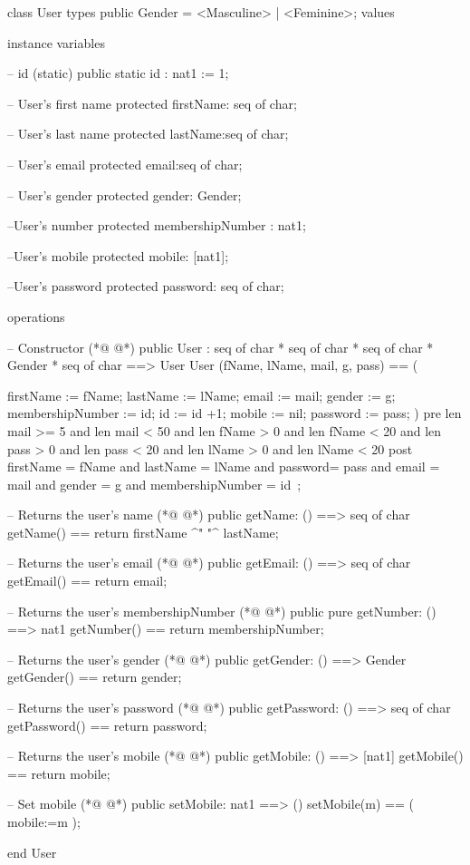 \begin{vdmpp}[breaklines=true]
class User
types
 public Gender = <Masculine> | <Feminine>;
values

instance variables
 
 -- id (static)
 public static id : nat1 := 1;
 
 -- User's first name
 protected firstName: seq of char;
 
 -- User's last name
 protected lastName:seq of char;
 
 -- User's email
 protected email:seq of char;
 
 -- User's gender
 protected gender: Gender;
 
 --User's number
 protected membershipNumber : nat1;
 
 --User's mobile
 protected mobile: [nat1];
 
 --User's password
 protected password: seq of char;
 
operations

 -- Constructor
(*@
\label{User:35}
@*)
 public User : seq of char * seq of char * seq of char * Gender * seq of char  ==> User
 User (fName, lName, mail, g, pass) == (
 
  firstName := fName;
   lastName := lName;
   email := mail;
   gender := g;
   membershipNumber := id;
   id := id +1;
   mobile := nil;
   password := pass;
 )
 pre len mail >= 5 and len mail < 50
  and len fName > 0 and len fName < 20
  and len pass > 0 and len pass < 20
  and len lName > 0 and len lName < 20
 post firstName = fName and lastName = lName and password= pass and email = mail and gender = g and membershipNumber = id~;
 
 
 -- Returns the user's name
(*@
\label{getName:55}
@*)
 public getName: () ==> seq of char
 getName() ==
  return firstName ^" "^ lastName;
  
  
 -- Returns the user's email
(*@
\label{getEmail:61}
@*)
 public getEmail: () ==> seq of char
 getEmail() ==
  return email;
  
  
 -- Returns the user's membershipNumber
(*@
\label{getNumber:67}
@*)
 public pure getNumber: () ==> nat1
 getNumber() ==
  return membershipNumber;
  
  
 -- Returns the user's gender
(*@
\label{getGender:73}
@*)
 public getGender: () ==> Gender
 getGender() ==
  return gender;

  
 -- Returns the user's password
(*@
\label{getPassword:79}
@*)
 public getPassword: () ==> seq of char
 getPassword() == return password;
  
  
 -- Returns the user's mobile
(*@
\label{getMobile:84}
@*)
 public getMobile: () ==> [nat1]
 getMobile() ==
  return mobile;
  
  
 -- Set mobile 
(*@
\label{setMobile:90}
@*)
 public setMobile: nat1 ==> ()
 setMobile(m) == (
  mobile:=m
 );
 
end User
\end{vdmpp}

